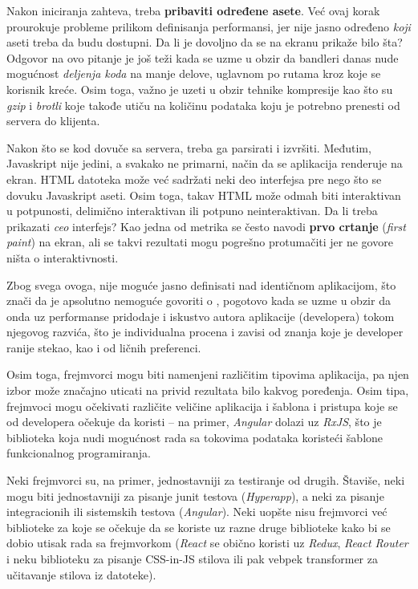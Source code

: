 Nakon iniciranja zahteva, treba \textbf{pribaviti određene asete}.
Već ovaj korak prourokuje probleme prilikom definisanja performansi, jer nije jasno određeno \emph{koji} aseti treba da budu dostupni.
Da li je dovoljno da se na ekranu prikaže bilo šta?
Odgovor na ovo pitanje je još teži kada se uzme u obzir da bandleri danas nude mogućnost \textit{deljenja koda} na manje delove, uglavnom po rutama kroz koje se korisnik kreće.
Osim toga, važno je uzeti u obzir tehnike kompresije kao što su \textit{gzip} i \textit{brotli} koje takođe utiču na količinu podataka koju je potrebno prenesti od servera do klijenta.

Nakon što se kod dovuče sa servera, treba ga parsirati i izvršiti.
Međutim, Javaskript nije jedini, a svakako ne primarni, način da se aplikacija renderuje na ekran.
HTML datoteka može već sadržati neki deo interfejsa pre nego što se dovuku Javaskript aseti.
Osim toga, takav HTML može odmah biti interaktivan u potpunosti, delimično interaktivan ili potpuno neinteraktivan.
Da li treba prikazati \textit{ceo} interfejs?
Kao jedna od metrika se često navodi \textbf{prvo crtanje} (\textsl{first paint}) na ekran, ali se takvi rezultati mogu pogrešno protumačiti jer ne govore ništa o interaktivnosti.

Zbog svega ovoga, nije moguće jasno definisati  nad identičnom aplikacijom, što znači da je apsolutno nemoguće govoriti o , pogotovo kada se uzme u obzir da onda uz performanse pridodaje i iskustvo autora aplikacije (developera) tokom njegovog razvića, što je individualna procena i zavisi od znanja koje je developer ranije stekao, kao i od ličnih preferenci.

Osim toga, frejmvorci mogu biti namenjeni različitim tipovima aplikacija, pa njen izbor može značajno uticati na privid rezultata bilo kakvog poređenja.
Osim tipa, frejmvoci mogu očekivati različite veličine aplikacija i šablona i pristupa koje se od developera očekuje da koristi -- na primer, \textsl{Angular} dolazi uz \textsl{RxJS}, što je biblioteka koja nudi mogućnost rada sa tokovima podataka koristeći šablone funkcionalnog programiranja.

Neki frejmvorci su, na primer, jednostavniji za testiranje od drugih.
Štaviše, neki mogu biti jednostavniji za pisanje junit testova (\textsl{Hyperapp}), a neki za pisanje integracionih ili sistemskih testova (\textsl{Angular}).
Neki  uopšte nisu frejmvorci već biblioteke za koje se očekuje da se koriste uz razne druge biblioteke kako bi se dobio utisak rada sa frejmvorkom (\textsl{React} se obično koristi uz \textsl{Redux}, \textsl{React Router} i neku biblioteku za pisanje CSS-in-JS stilova ili pak vebpek transformer za učitavanje stilova iz  datoteke).

